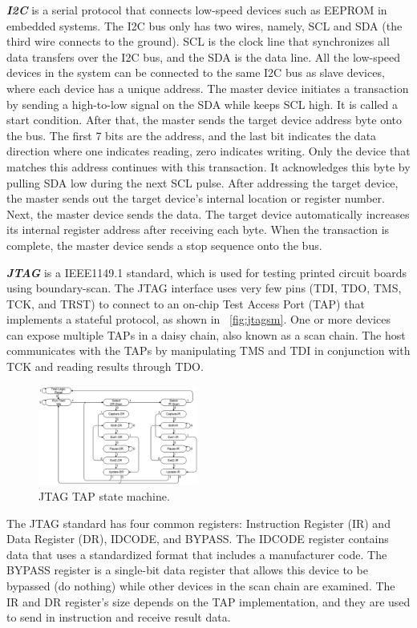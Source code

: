 \textbf{\textit{I2C}} is a serial protocol that connects low-speed devices such as EEPROM in embedded systems. The I2C bus only has two wires, namely, SCL and SDA (the third wire connects to the ground). SCL is the clock line that synchronizes all data transfers over the I2C bus, and the SDA is the data line. All the low-speed devices in the system can be connected to the same I2C bus as slave devices, where each device has a unique address. The master device initiates a transaction by sending a high-to-low signal on the SDA while keeps SCL high. It is called a start condition. After that, the master sends the target device address byte onto the bus. The first 7 bits are the address, and the last bit indicates the data direction where one indicates reading, zero indicates writing. Only the device that matches this address continues with this transaction. It acknowledges this byte by pulling SDA low during the next SCL pulse. After addressing the target device, the master sends out the target device's internal location or register number. Next, the master device sends the data. The target device automatically increases its internal register address after receiving each byte. When the transaction is complete, the master device sends a stop sequence onto the bus.


\textbf{\textit{JTAG}} is a IEEE1149.1 standard, which is used for testing printed circuit boards using boundary-scan. The JTAG interface uses very few pins (TDI, TDO, TMS, TCK, and TRST) to connect to an on-chip Test Access Port (TAP) that implements a stateful protocol, as shown in ~\autoref{fig:jtagsm}.  One or more devices can expose multiple TAPs in a daisy chain, also known as a scan chain. The host communicates with the TAPs by manipulating TMS and TDI in conjunction with TCK and reading results through TDO.


\begin{figure}[ht]
	\includegraphics[width=0.47\textwidth]{figures/jtagsm}
	\centering
	\caption{JTAG TAP state machine.}
	\label{fig:jtagsm}
\end{figure}


The JTAG standard has four common registers: Instruction Register (IR) and Data Register (DR),  IDCODE, and BYPASS. The IDCODE register contains data that uses a standardized format that includes a manufacturer code. The BYPASS register is a single-bit data register that allows this device to be bypassed (do nothing) while other devices in the scan chain are examined. The IR and DR register's size depends on the TAP implementation, and they are used to send in instruction and receive result data.

